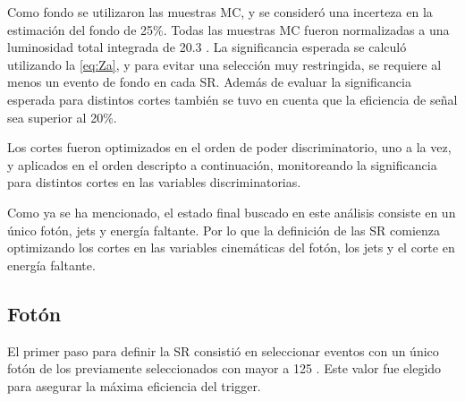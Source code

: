 Como fondo se utilizaron las muestras MC, y se consideró una incerteza en la estimación del
fondo de 25\%. Todas las muestras MC fueron normalizadas a una luminosidad total
integrada de 20.3 \ifb. La significancia esperada se calculó utilizando la
\cref{eq:Za}, y para evitar una selección muy restringida, se requiere al menos
un evento de fondo en cada SR. Además de evaluar la significancia esperada para
distintos cortes también se tuvo en cuenta que la eficiencia de señal sea
superior al 20\%.

Los cortes fueron optimizados en el orden de poder discriminatorio, uno a la
vez, y aplicados en el orden descripto a continuación, monitoreando la
significancia para distintos cortes en las variables discriminatorias.

Como ya se ha mencionado, el estado final buscado en este análisis consiste en un
único fotón, jets y energía faltante. Por lo que la definición de las SR
comienza optimizando los cortes en las variables cinemáticas del fotón, los jets
y el corte en energía faltante.




\subsection{Fotón}\label{sec:opt_ph_iso}

El primer paso para definir la SR consistió en seleccionar eventos con un único
fotón de los previamente seleccionados con {\pt} mayor a 125 \gev. Este valor
fue elegido para asegurar la máxima eficiencia del trigger.

